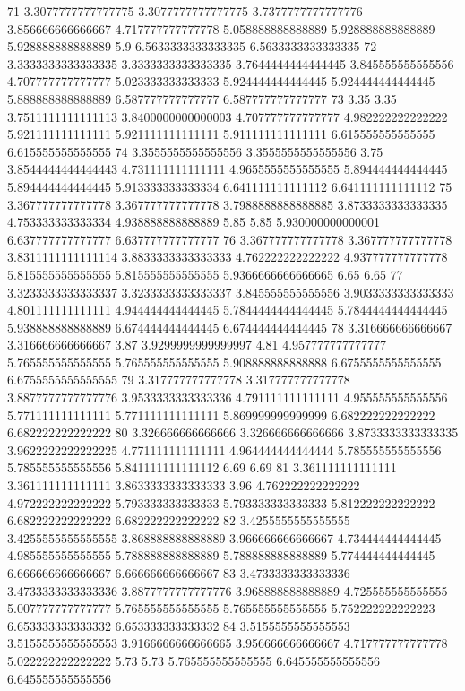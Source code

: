 71 3.3077777777777775 3.3077777777777775 3.7377777777777776 3.856666666666667 4.717777777777778 5.058888888888889 5.928888888888889 5.928888888888889 5.9 6.5633333333333335 6.5633333333333335
72 3.3333333333333335 3.3333333333333335 3.7644444444444445 3.845555555555556 4.707777777777777 5.023333333333333 5.924444444444445 5.924444444444445 5.888888888888889 6.587777777777777 6.587777777777777
73 3.35 3.35 3.7511111111111113 3.8400000000000003 4.707777777777777 4.982222222222222 5.921111111111111 5.921111111111111 5.911111111111111 6.615555555555555 6.615555555555555
74 3.3555555555555556 3.3555555555555556 3.75 3.8544444444444443 4.731111111111111 4.9655555555555555 5.894444444444445 5.894444444444445 5.913333333333334 6.641111111111112 6.641111111111112
75 3.367777777777778 3.367777777777778 3.7988888888888885 3.8733333333333335 4.753333333333334 4.938888888888889 5.85 5.85 5.930000000000001 6.637777777777777 6.637777777777777
76 3.367777777777778 3.367777777777778 3.8311111111111114 3.8833333333333333 4.762222222222222 4.937777777777778 5.815555555555555 5.815555555555555 5.9366666666666665 6.65 6.65
77 3.3233333333333337 3.3233333333333337 3.845555555555556 3.9033333333333333 4.801111111111111 4.944444444444445 5.7844444444444445 5.7844444444444445 5.938888888888889 6.674444444444445 6.674444444444445
78 3.316666666666667 3.316666666666667 3.87 3.9299999999999997 4.81 4.957777777777777 5.765555555555555 5.765555555555555 5.908888888888888 6.6755555555555555 6.6755555555555555
79 3.317777777777778 3.317777777777778 3.8877777777777776 3.9533333333333336 4.791111111111111 4.955555555555556 5.771111111111111 5.771111111111111 5.869999999999999 6.682222222222222 6.682222222222222
80 3.326666666666666 3.326666666666666 3.8733333333333335 3.9622222222222225 4.771111111111111 4.964444444444444 5.785555555555556 5.785555555555556 5.841111111111112 6.69 6.69
81 3.361111111111111 3.361111111111111 3.8633333333333333 3.96 4.762222222222222 4.972222222222222 5.793333333333333 5.793333333333333 5.812222222222222 6.682222222222222 6.682222222222222
82 3.4255555555555555 3.4255555555555555 3.868888888888889 3.966666666666667 4.734444444444445 4.985555555555555 5.788888888888889 5.788888888888889 5.774444444444445 6.666666666666667 6.666666666666667
83 3.4733333333333336 3.4733333333333336 3.8877777777777776 3.968888888888889 4.725555555555555 5.007777777777777 5.765555555555555 5.765555555555555 5.752222222222223 6.653333333333332 6.653333333333332
84 3.5155555555555553 3.5155555555555553 3.9166666666666665 3.956666666666667 4.717777777777778 5.022222222222222 5.73 5.73 5.765555555555555 6.645555555555556 6.645555555555556
